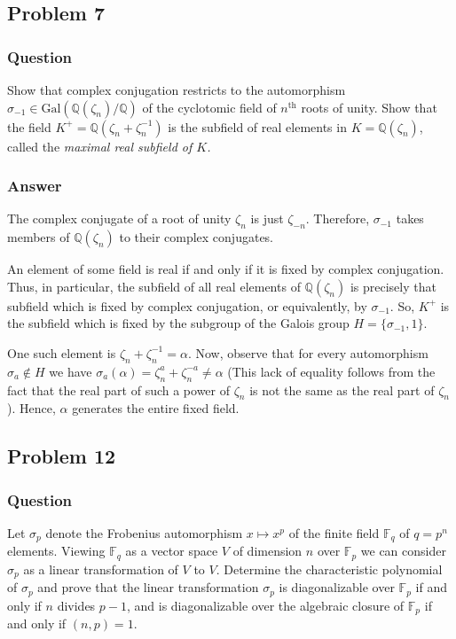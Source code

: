 \documentclass[10pt]{article}
\begin{document}
\subsection{Problem 7}
\subsubsection{Question}
Show that complex conjugation restricts to the automorphism $\sigma_{-1} \in \mathrm{Gal}(\mathbb{Q}(\zeta_n)/\mathbb{Q})$ of the cyclotomic field of $n^\mathrm{th}$ roots of unity. Show that the field $K^+=\mathbb{Q}(\zeta_n+\zeta_n^{-1})$ is the subfield of real elements in $K=\mathbb{Q}(\zeta_n)$, called the \emph{maximal real subfield of $K$.}
\subsubsection{Answer}
The complex conjugate of a root of unity $\zeta_n$ is just $\zeta_{-n}$. Therefore, $\sigma_{-1}$ takes members of $\mathbb{Q}(\zeta_n)$ to their complex conjugates.

An element of some field is real if and only if it is fixed by complex conjugation. Thus, in particular, the subfield of all real elements of $\mathbb{Q}(\zeta_n)$ is precisely that subfield which is fixed by complex conjugation, or equivalently, by $\sigma_{-1}$. So, $K^+$ is the subfield which is fixed by the subgroup of the Galois group $H = \{\sigma_{-1}, 1\}$. 

One such element is $\zeta_n+\zeta_n^{-1} = \alpha$. Now, observe that for every automorphism $\sigma_a \notin H$ we have $\sigma_a(\alpha) = \zeta_n^a + \zeta_n^{-a} \neq \alpha$ (This lack of equality follows from the fact that the real part of such a power of $\zeta_n$ is not the same as the real part of $\zeta_n$). Hence, $\alpha$ generates the entire fixed field.


\subsection{Problem 12}
\subsubsection{Question}
Let $\sigma_p$ denote the Frobenius automorphism $x \mapsto x^p$ of the finite field $\mathbb{F}_q$ of $q =p^n$ elements. Viewing $\mathbb{F}_q$ as a vector space $V$ of dimension $n$ over $\mathbb{F}_p$ we can consider $\sigma_p$ as a linear transformation of $V$ to $V$. Determine the characteristic polynomial of $\sigma_p$ and prove that the linear transformation $\sigma_p$ is diagonalizable over $\mathbb{F}_p$ if and only if $n$ divides $p-1$, and is diagonalizable over the algebraic closure of $\mathbb{F}_p$ if and only if $(n,p)=1$.
\end{document}
